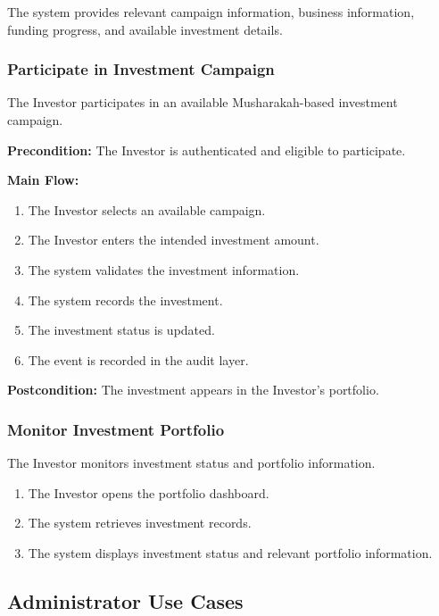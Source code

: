 The system provides relevant campaign information, business information,
funding progress, and available investment details.


\subsubsection{Participate in Investment Campaign}

The Investor participates in an available Musharakah-based investment
campaign.

\textbf{Precondition:}
The Investor is authenticated and eligible to participate.

\textbf{Main Flow:}
\begin{enumerate}
    \item The Investor selects an available campaign.
    \item The Investor enters the intended investment amount.
    \item The system validates the investment information.
    \item The system records the investment.
    \item The investment status is updated.
    \item The event is recorded in the audit layer.
\end{enumerate}

\textbf{Postcondition:}
The investment appears in the Investor's portfolio.


\subsubsection{Monitor Investment Portfolio}

The Investor monitors investment status and portfolio information.

\begin{enumerate}
    \item The Investor opens the portfolio dashboard.
    \item The system retrieves investment records.
    \item The system displays investment status and relevant portfolio
    information.
\end{enumerate}



\subsection{Administrator Use Cases}


